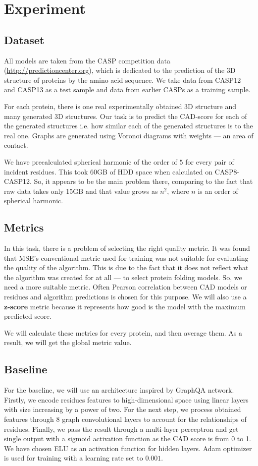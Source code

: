 \documentclass[12pt,twoside]{article}
\begin{document}
	\section{Experiment}
	\subsection{Dataset}
	All models are taken from the CASP competition data (\url{http://predictioncenter.org}), which is dedicated to the prediction 
	of the 3D structure of proteins by the amino acid sequence. We take data from CASP12 and CASP13 as a test sample and data from
	earlier CASPs as a training sample.

	For each protein, there is one real experimentally obtained 3D structure and many generated 3D structures. Our task is to predict 
	the CAD-score \cite{Olechnovic2012} for each of the generated structures i.e. how similar each of the generated structures is to the real one.
	Graphs are generated using Voronoi diagrams with weights — an area of contact.

	We have precalculated spherical harmonic of the order of $5$ for every pair of incident residues. This took 60GB of HDD space when
	calculated on CASP8-CASP12. So, it appears to be the main problem there, comparing to the fact that raw data takes only
	15GB and that value grows as $n^2$, where $n$ is an order of spherical harmonic.

	\subsection{Metrics}
	In this task, there is a problem of selecting the right quality metric. It was found that MSE's conventional metric used
	for training was not suitable for evaluating the quality of the algorithm. This is due to the fact that it does not 
	reflect what the algorithm was created for at all — to select protein folding models. So, we need a more suitable metric.
	Often Pearson correlation between CAD models or residues and algorithm predictions is chosen for this purpose\cite{Baldassarre2020GRAPHQAPM}.
	We will also use a \textbf{z-score} metric because it represents how good is the model with the
	maximum predicted score.

	We will calculate these metrics for every protein, and then average them. As a result, we will get the global metric value.

	\subsection{Baseline}
	For the baseline, we will use an architecture inspired by GraphQA\cite{Baldassarre2020GRAPHQAPM} network. Firstly, we encode residues features
	to high-dimensional space using linear layers with size increasing by a power of two. For the next step, we process obtained features through
	8 graph convolutional layers to account for the relationships of residues. Finally, we pass the result through a multi-layer perceptron and get
	single output with a sigmoid activation function as the CAD score is from 0 to 1. We have chosen ELU as an activation function for hidden layers.
	Adam optimizer\cite{Kingma2014} is used for training with a learning rate set to $0.001$.
\end{document}
